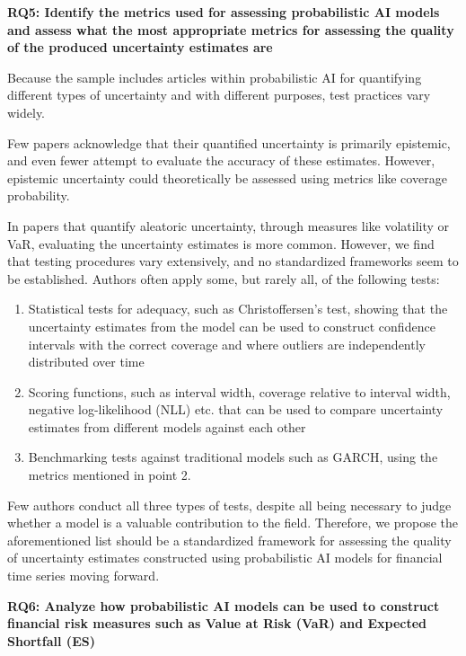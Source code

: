 \textbf{RQ5: Identify the metrics used for assessing probabilistic AI models and assess what the most appropriate metrics for assessing the quality of the produced uncertainty estimates are}\nopagebreak

Because the sample includes articles within probabilistic AI for quantifying different types of uncertainty and with different purposes, test practices vary widely.

Few papers acknowledge that their quantified uncertainty is primarily epistemic, and even fewer attempt to evaluate the accuracy of these estimates. However, epistemic uncertainty could theoretically be assessed using metrics like coverage probability.

In papers that quantify aleatoric uncertainty, through measures like volatility or VaR, evaluating the uncertainty estimates is more common. However, we find that testing procedures vary extensively, and no standardized frameworks seem to be established. Authors often apply some, but rarely all, of the following tests:

\begin{enumerate}
    \item Statistical tests for adequacy, such as Christoffersen's test, showing that the uncertainty estimates from the model can be used to construct confidence intervals with the correct coverage and where outliers are independently distributed over time
    \item Scoring functions, such as interval width, coverage relative to interval width, negative log-likelihood (NLL) etc. that can be used to compare uncertainty estimates from different models against each other
    \item Benchmarking tests against traditional models such as GARCH, using the metrics mentioned in point 2.
\end{enumerate}

Few authors conduct all three types of tests, despite all being necessary to judge whether a model is a valuable contribution to the field. Therefore, we propose the aforementioned list should be a standardized framework for assessing the quality of uncertainty estimates constructed using probabilistic AI models for financial time series moving forward. 

\textbf{RQ6: Analyze how probabilistic AI models can be used to construct financial risk measures such as Value at Risk (VaR) and Expected Shortfall (ES)}\nopagebreak

